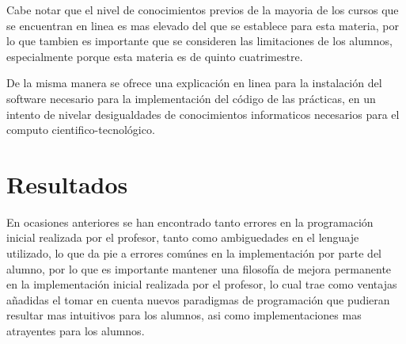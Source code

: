 	Cabe notar que el nivel de conocimientos previos de la mayoria de los cursos que se encuentran en linea es mas elevado del que se establece para esta materia, por lo que tambien es importante que se consideren las limitaciones de los alumnos, especialmente porque esta materia es de quinto cuatrimestre.

	De la misma manera se ofrece una explicación en linea\cite{github:instalacion} para la instalación del software necesario para la implementación del código de las prácticas, en un intento de nivelar desigualdades de conocimientos informaticos necesarios para el computo cientifico-tecnológico.


\section{Resultados}

	En ocasiones anteriores se han encontrado tanto errores en la programación inicial realizada por el profesor, tanto como ambiguedades en el lenguaje utilizado, lo que da pie a errores comúnes en la implementación por parte del alumno, por lo que es importante mantener una filosofía de mejora permanente en la implementación inicial realizada por el profesor, lo cual trae como ventajas añadidas el tomar en cuenta nuevos paradigmas de programación que pudieran resultar mas intuitivos para los alumnos, asi como implementaciones mas atrayentes para los alumnos.


{}





